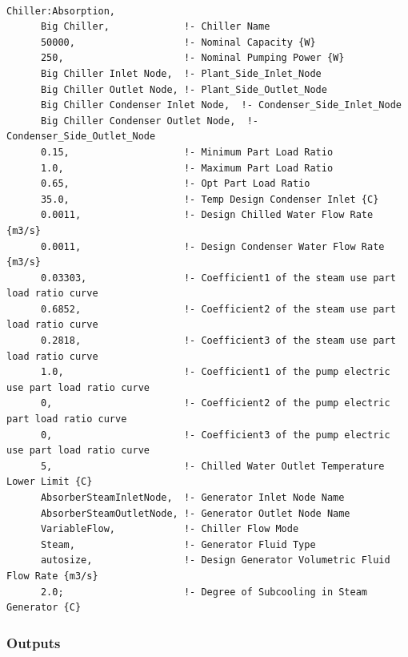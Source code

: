\begin{lstlisting}

Chiller:Absorption,
      Big Chiller,             !- Chiller Name
      50000,                   !- Nominal Capacity {W}
      250,                     !- Nominal Pumping Power {W}
      Big Chiller Inlet Node,  !- Plant_Side_Inlet_Node
      Big Chiller Outlet Node, !- Plant_Side_Outlet_Node
      Big Chiller Condenser Inlet Node,  !- Condenser_Side_Inlet_Node
      Big Chiller Condenser Outlet Node,  !- Condenser_Side_Outlet_Node
      0.15,                    !- Minimum Part Load Ratio
      1.0,                     !- Maximum Part Load Ratio
      0.65,                    !- Opt Part Load Ratio
      35.0,                    !- Temp Design Condenser Inlet {C}
      0.0011,                  !- Design Chilled Water Flow Rate {m3/s}
      0.0011,                  !- Design Condenser Water Flow Rate {m3/s}
      0.03303,                 !- Coefficient1 of the steam use part load ratio curve
      0.6852,                  !- Coefficient2 of the steam use part load ratio curve
      0.2818,                  !- Coefficient3 of the steam use part load ratio curve
      1.0,                     !- Coefficient1 of the pump electric use part load ratio curve
      0,                       !- Coefficient2 of the pump electric part load ratio curve
      0,                       !- Coefficient3 of the pump electric use part load ratio curve
      5,                       !- Chilled Water Outlet Temperature Lower Limit {C}
      AbsorberSteamInletNode,  !- Generator Inlet Node Name
      AbsorberSteamOutletNode, !- Generator Outlet Node Name
      VariableFlow,            !- Chiller Flow Mode
      Steam,                   !- Generator Fluid Type
      autosize,                !- Design Generator Volumetric Fluid Flow Rate {m3/s}
      2.0;                     !- Degree of Subcooling in Steam Generator {C}
\end{lstlisting}

\subsubsection{Outputs}\label{outputs-025}

